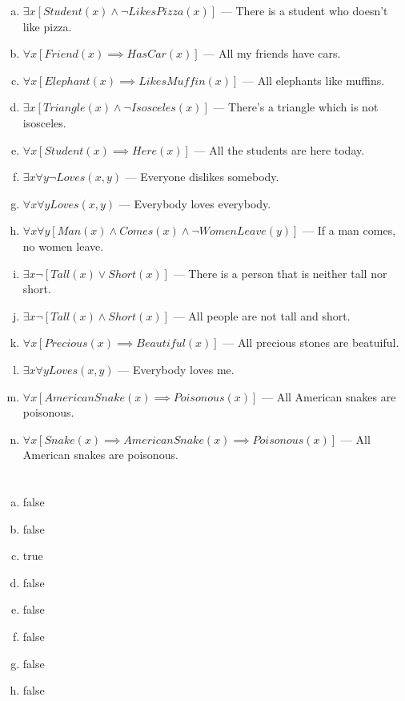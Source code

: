 \documentclass{article}
\begin{document}
\begin{enumerate}[(a)]
\item $\exists x [Student(x) \wedge \neg LikesPizza(x)]$ --- There is a student who doesn't like pizza.
\item $\forall x [Friend(x) \implies HasCar(x)]$ --- All my friends have cars.
\item $\forall x [Elephant(x) \implies LikesMuffin(x)]$ --- All elephants like muffins.
\item $\exists x [Triangle(x) \wedge \neg Isosceles(x)]$ --- There's a triangle which is not isosceles.
\item $\forall x [Student(x) \implies Here(x)]$ --- All the students are here today.
\item $\exists x \forall y \neg Loves(x, y)$ --- Everyone dislikes somebody.
\item $\forall x \forall y Loves(x, y)$ --- Everybody loves everybody.
\item $\forall x \forall y[Man(x) \wedge Comes(x) \wedge \neg WomenLeave(y)]$ --- If a man comes, no women leave.
\item $\exists x \neg [Tall(x) \vee Short(x)]$ --- There is a person that is neither tall nor short.
\item $\exists x \neg [Tall(x) \wedge Short(x)]$ --- All people are not tall and short.
\item $\forall x [Precious(x) \implies Beautiful(x)]$ --- All precious stones are beatuiful.
\item $\exists x \forall y Loves(x, y)$ --- Everybody loves me.
\item $\forall x [AmericanSnake(x) \implies Poisonous(x)]$ --- All American snakes are poisonous.
\item $\forall x [Snake(x) \implies AmericanSnake(x) \implies Poisonous(x)]$ --- All American snakes are poisonous.
\end{enumerate}

\section{}

\begin{enumerate}[(a)]
\item false
\item false
\item true
\item false
\item false
\item false
\item false
\item false
\end{enumerate}
\end{document}
